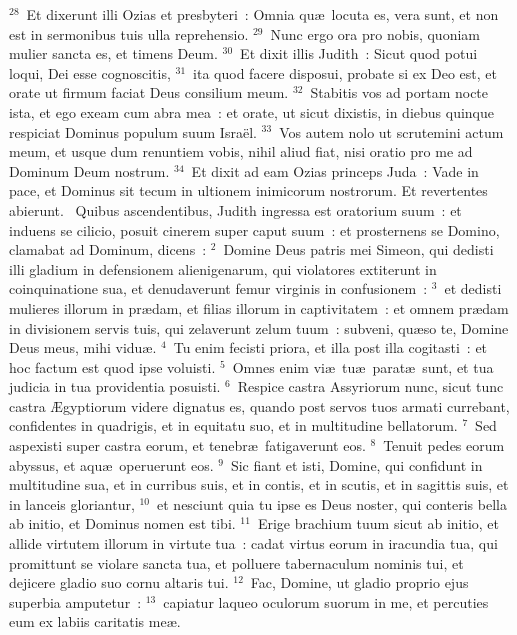 ${}^{28}$~Et dixerunt illi Ozias et presbyteri~: Omnia qu\ae\ locuta es, vera sunt, et non est in sermonibus tuis ulla reprehensio.
${}^{29}$~Nunc ergo ora pro nobis, quoniam mulier sancta es, et timens Deum.
${}^{30}$~Et dixit illis Judith~: Sicut quod potui loqui, Dei esse cognoscitis,
${}^{31}$~ita quod facere disposui, probate si ex Deo est, et orate ut firmum faciat Deus consilium meum.
${}^{32}$~Stabitis vos ad portam nocte ista, et ego exeam cum abra mea~: et orate, ut sicut dixistis, in diebus quinque respiciat Dominus populum suum Isra\"el.
${}^{33}$~Vos autem nolo ut scrutemini actum meum, et usque dum renuntiem vobis, nihil aliud fiat, nisi oratio pro me ad Dominum Deum nostrum.
${}^{34}$~Et dixit ad eam Ozias princeps Juda~: Vade in pace, et Dominus sit tecum in ultionem inimicorum nostrorum. Et revertentes abierunt.
~Quibus ascendentibus, Judith ingressa est oratorium suum~: et induens se cilicio, posuit cinerem super caput suum~: et prosternens se Domino, clamabat ad Dominum, dicens~:
${}^{2}$~Domine Deus patris mei Simeon, qui dedisti illi gladium in defensionem alienigenarum, qui violatores extiterunt in coinquinatione sua, et denudaverunt femur virginis in confusionem~:
${}^{3}$~et dedisti mulieres illorum in pr\ae dam, et filias illorum in captivitatem~: et omnem pr\ae dam in divisionem servis tuis, qui zelaverunt zelum tuum~: subveni, qu\ae so te, Domine Deus meus, mihi vidu\ae .
${}^{4}$~Tu enim fecisti priora, et illa post illa cogitasti~: et hoc factum est quod ipse voluisti.
${}^{5}$~Omnes enim vi\ae\ tu\ae\ parat\ae\ sunt, et tua judicia in tua providentia posuisti.
${}^{6}$~Respice castra Assyriorum nunc, sicut tunc castra \AE gyptiorum videre dignatus es, quando post servos tuos armati currebant, confidentes in quadrigis, et in equitatu suo, et in multitudine bellatorum.
${}^{7}$~Sed aspexisti super castra eorum, et tenebr\ae\ fatigaverunt eos.
${}^{8}$~Tenuit pedes eorum abyssus, et aqu\ae\ operuerunt eos.
${}^{9}$~Sic fiant et isti, Domine, qui confidunt in multitudine sua, et in curribus suis, et in contis, et in scutis, et in sagittis suis, et in lanceis gloriantur,
${}^{10}$~et nesciunt quia tu ipse es Deus noster, qui conteris bella ab initio, et Dominus nomen est tibi.
${}^{11}$~Erige brachium tuum sicut ab initio, et allide virtutem illorum in virtute tua~: cadat virtus eorum in iracundia tua, qui promittunt se violare sancta tua, et polluere tabernaculum nominis tui, et dejicere gladio suo cornu altaris tui.
${}^{12}$~Fac, Domine, ut gladio proprio ejus superbia amputetur~:
${}^{13}$~capiatur laqueo oculorum suorum in me, et percuties eum ex labiis caritatis me\ae .

